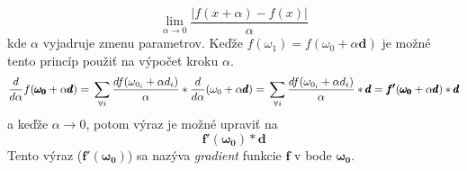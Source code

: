 \begin{equation}
    \lim_{\alpha\to0}\frac{|f(x + \alpha) - f(x)|}{\alpha}
\end{equation}
kde $\alpha$ vyjadruje zmenu parametrov.
Keďže $f(\omega_1)=f(\omega_0+\alpha\pmb{d})$ je možné tento princíp použiť na výpočet kroku $\alpha$.
\begin{equation}
    \frac{d}{d\alpha}f(\pmb{\omega_0}+\alpha\pmb{d}) = \\
    \sum_{\forall i}{\frac{d f(\omega_{0_i} + \alpha{d_i})}{\alpha}}*\frac{d}{d\alpha}(\omega_0+\alpha\pmb{d}) = \\
    \sum_{\forall i}{\frac{d f(\omega_{0_i} + \alpha{d_i})}{\alpha}}*\pmb{d} = \\
    \pmb{f'}(\pmb{\omega_0}+\alpha\pmb{d})*\pmb{d}
\end{equation}
a keďže $\alpha\to0$, potom výraz je možné upraviť na
\begin{equation}
    \pmb{f'}(\pmb{\omega_0})*\pmb{d}
\end{equation}
Tento výraz ($\pmb{f'}(\pmb{\omega_0})$) sa nazýva \emph{gradient} funkcie $\pmb{f}$ v bode $\pmb{\omega_0}$.

